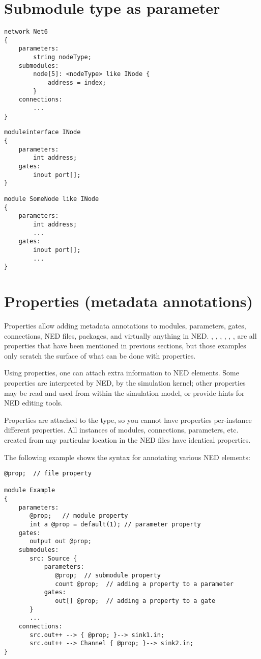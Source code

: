 \section{Submodule type as parameter}

\begin{Verbatim}
network Net6
{
    parameters:
        string nodeType;
    submodules:
        node[5]: <nodeType> like INode {
            address = index;
        }
    connections:
        ...
}
\end{Verbatim}

\begin{Verbatim}
moduleinterface INode
{
    parameters:
        int address;
    gates:
        inout port[];
}
\end{Verbatim}

\begin{Verbatim}
module SomeNode like INode
{
    parameters:
        int address;
        ...
    gates:
        inout port[];
        ...
}
\end{Verbatim}



\section{Properties (metadata annotations)}

Properties allow adding metadata annotations to modules, parameters, gates,
connections, NED files, packages, and virtually anything in NED.
, , , , ,
,  are all properties that have been mentioned in
previous sections, but those examples only scratch the surface of what can
be done with properties.

Using properties, one can attach extra information to NED elements. Some
properties are interpreted by NED, by the simulation kernel; other
properties may be read and used from within the simulation model, or
provide hints for NED editing tools.

Properties are attached to the type, so you cannot have properties
per-instance different properties. All instances of modules, connections,
parameters, etc. created from any particular location in the NED files have
identical properties.

The following example shows the syntax for annotating various NED elements:

\begin{Verbatim}
@prop;  // file property

module Example
{
    parameters:
       @prop;   // module property
       int a @prop = default(1); // parameter property
    gates:
       output out @prop;
    submodules:
       src: Source {
           parameters:
              @prop;  // submodule property
              count @prop;  // adding a property to a parameter
           gates:
              out[] @prop;  // adding a property to a gate
       }
       ...
    connections:
       src.out++ --> { @prop; }--> sink1.in;
       src.out++ --> Channel { @prop; }--> sink2.in;
}
\end{Verbatim}



